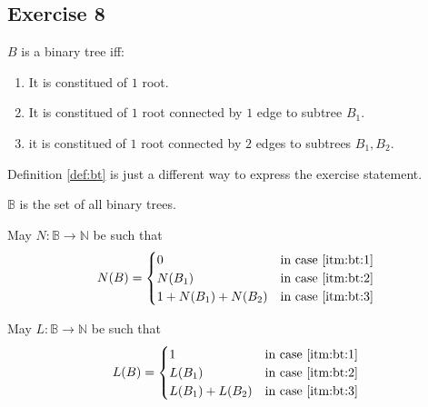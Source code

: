 \documentclass[docid=TP01]{tcom_TP}
\begin{document}
\subsection{Exercise 8}
\begin{definition}
\label{def:bt}
	$B$ is a binary tree iff:
	\begin{enumerate}
  		\item \label{itm:bt:1} It is constitued of $1$ root.
  		\item \label{itm:bt:2} It is constitued of $1$ root connected by $1$ edge to  subtree $B_1$.
  		\item \label{itm:bt:3} it is constitued of $1$ root connected by $2$ edges to subtrees $B_1,B_2$.
	\end{enumerate}
\end{definition}
\begin{remark}
	Definition \ref{def:bt} is just a different way to express the exercise statement.
\end{remark}
\begin{definition}
	$\mathbb{B}$ is the set of all binary trees.
\end{definition}
\begin{definition}
	May $N\colon\mathbb{B}\rightarrow\mathbb{N}$ be such that
	\begin{alignat*}{2}
		N(B)= \begin{cases}
			  0               & \text{in case \ref{itm:bt:1}}\\
			  N(B_1)          & \text{in case \ref{itm:bt:2}}\\
			  1+N(B_1)+N(B_2) & \text{in case \ref{itm:bt:3}}\\
			  \end{cases}
	\end{alignat*}
\end{definition}
\begin{definition}
	May $L\colon\mathbb{B}\rightarrow\mathbb{N}$ be such that
	\begin{alignat*}{2}
		L(B)= \begin{cases}
			  1             & \text{in case \ref{itm:bt:1}}\\
			  L(B_1)        & \text{in case \ref{itm:bt:2}}\\
			  L(B_1)+L(B_2) & \text{in case \ref{itm:bt:3}}\\
			  \end{cases}
	\end{alignat*}
\end{definition}
\end{document}
